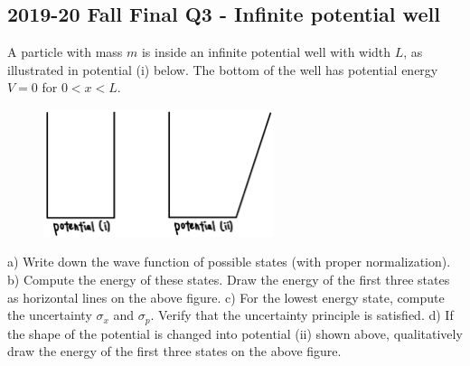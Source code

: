 \documentclass[12pt]{book} %
\numberwithin{equation}{chapter}
\def\s{\sigma}
\begin{document}
\subsection*{2019-20 Fall Final Q3 - Infinite potential well}
A particle with mass $m$ is inside an infinite potential well with width $L$, as illustrated in potential (i) below. The bottom of the well has potential energy $V=0$ for $0<x<L$.
\begin{figure}[H]
\centering
\includegraphics[width=0.6\textwidth]{Infinite potential well}
\end{figure}
\noindent a) Write down the wave function of possible states (with proper normalization).\bigskip\newline
b) Compute the energy of these states. Draw the energy of the first three states as horizontal lines on the above figure.\bigskip\newline
c) For the lowest energy state, compute the uncertainty $\s_{x}$ and $\s_{p}$. Verify that the uncertainty principle is satisfied.\bigskip\newline
d) If the shape of the potential is changed into potential (ii) shown above, qualitatively draw the energy of the first three states on the above figure.
\end{document}
